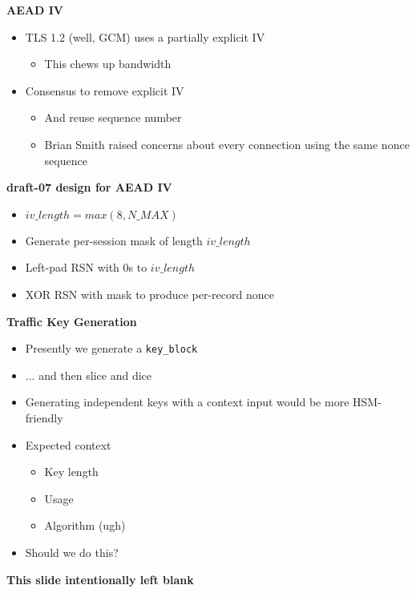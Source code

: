 \documentclass[helvetica]{seminar}
\newcommand{\heading}[1]{%
  \begin{center} 
    \large\bf 
    #1 
  \end{center} 
  \vspace{.4 in}}
\begin{document}
\begin{slide}
\heading{AEAD IV}

\begin{itemize}
\item TLS 1.2 (well, GCM) uses a partially explicit IV
  \begin{itemize}
  \item This chews up bandwidth
  \end{itemize}
  
\item Consensus to remove explicit IV
  \begin{itemize}
  \item And reuse sequence number
  \item Brian Smith raised concerns about every connection using the same nonce sequence
  \end{itemize}
\end{itemize}
\end{slide}


\begin{slide}
\heading{draft-07 design for AEAD IV}

\begin{itemize}
\item $iv\_length = max(8, N\_MAX)$
\item Generate per-session mask of length $iv\_length$
\item Left-pad RSN with 0s to $iv\_length$
\item XOR RSN with mask to produce per-record nonce
\end{itemize}
\end{slide}



\begin{slide}
\heading{Traffic Key Generation}

\begin{itemize}
\item Presently we generate a \verb^key_block^
\item ... and then slice and dice
\item Generating independent keys with a context input would be more HSM-friendly
\item Expected context
  \begin{itemize}
  \item Key length
  \item Usage
  \item Algorithm (ugh)
  \end{itemize}
\item Should we do this?
\end{itemize}
\end{slide}


\begin{itemize}
\heading{This slide intentionally left blank}
\end{itemize}
\end{document}
